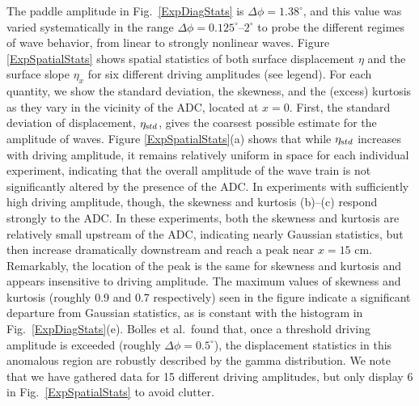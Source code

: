 \documentclass[11pt]{article}
\newcommand{\etastd}{\eta_{\text std}}
\newcommand{\Dphi}{\Delta \phi}
\begin{document}
	The paddle amplitude in Fig.~\ref{ExpDiagStats} is $\Dphi = 1.38^{\circ}$, and this value was varied systematically in the range $\Dphi = 0.125^{\circ}$--$2^{\circ}$ to probe the different regimes of wave behavior, from linear to strongly nonlinear waves. Figure \ref{ExpSpatialStats} shows spatial statistics of both surface displacement $\eta$ and the surface slope $\eta_x$ for six different driving amplitudes (see legend). For each quantity, we show the standard deviation, the skewness, and the (excess) kurtosis as they vary in the vicinity of the ADC, located at $x=0$. First, the standard deviation of displacement, $\etastd$, gives the coarsest possible estimate for the amplitude of waves. Figure \ref{ExpSpatialStats}(a) shows that while $\etastd$ increases with driving amplitude, it remains relatively uniform in space for each individual experiment, indicating that the overall amplitude of the wave train is not significantly altered by the presence of the ADC. In experiments with sufficiently high driving amplitude, though, the skewness and kurtosis (b)--(c) respond strongly to the ADC. In these experiments, both the skewness and kurtosis are relatively small upstream of the ADC, indicating nearly Gaussian statistics, but then increase dramatically downstream and reach a peak near $x = 15$ cm. Remarkably, the location of the peak is the same for skewness and kurtosis and appears insensitive to driving amplitude. The maximum values of skewness and kurtosis (roughly 0.9 and 0.7 respectively) seen in the figure indicate a significant departure from Gaussian statistics, as is constant with the histogram in Fig.~\ref{ExpDiagStats}(e). Bolles et al.~found that, once a threshold driving amplitude is exceeded (roughly $\Dphi = 0.5^{\circ}$), the displacement statistics in this anomalous region are robustly described by the gamma distribution. We note that we have gathered data for 15 different driving amplitudes, but only display 6 in Fig.~\ref{ExpSpatialStats} to avoid clutter. 
\end{document}
